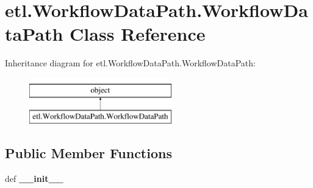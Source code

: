 \hypertarget{classetl_1_1WorkflowDataPath_1_1WorkflowDataPath}{\section{etl.\-Workflow\-Data\-Path.\-Workflow\-Data\-Path Class Reference}
\label{classetl_1_1WorkflowDataPath_1_1WorkflowDataPath}
}
Inheritance diagram for etl.\-Workflow\-Data\-Path.\-Workflow\-Data\-Path\-:\begin{figure}[H]
\begin{center}
\leavevmode
\includegraphics[height=2.000000cm]{classetl_1_1WorkflowDataPath_1_1WorkflowDataPath}
\end{center}
\end{figure}
\subsection*{Public Member Functions}
\begin{DoxyCompactItemize}
\item 
\hypertarget{classetl_1_1WorkflowDataPath_1_1WorkflowDataPath_afae37c9b8563fa47af0c879335140bda}{def {\bfseries \-\_\-\-\_\-init\-\_\-\-\_\-}}\label{classetl_1_1WorkflowDataPath_1_1WorkflowDataPath_afae37c9b8563fa47af0c879335140bda}

\end{DoxyCompactItemize}
